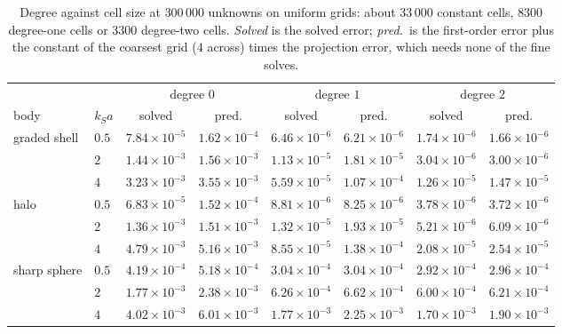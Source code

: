 \documentclass[11pt,a4paper]{article}
\begin{document}
\begin{table}[htbp]
\centering
\caption{Degree against cell size at $300\,000$ unknowns on uniform grids: about $33\,000$ constant cells,
$8300$ degree-one cells or $3300$ degree-two cells. \emph{Solved} is the solved error; \emph{pred.}\ is
the first-order error plus the constant of the coarsest grid ($4$ across) times the projection error,
which needs none of the fine solves.}\label{tab:degreebudget}
\small
\begin{tabular}{@{}llcccccc@{}}
\toprule
 & & \multicolumn{2}{c}{degree $0$} & \multicolumn{2}{c}{degree $1$} & \multicolumn{2}{c}{degree $2$} \\
body & $k_Sa$ & solved & pred. & solved & pred. & solved & pred. \\
\midrule
graded shell & $0.5$ & $7.84\times10^{-5}$ & $1.62\times10^{-4}$ & $6.46\times10^{-6}$ & $6.21\times10^{-6}$ & $1.74\times10^{-6}$ & $1.66\times10^{-6}$ \\
 & $2$ & $1.44\times10^{-3}$ & $1.56\times10^{-3}$ & $1.13\times10^{-5}$ & $1.81\times10^{-5}$ & $3.04\times10^{-6}$ & $3.00\times10^{-6}$ \\
 & $4$ & $3.23\times10^{-3}$ & $3.55\times10^{-3}$ & $5.59\times10^{-5}$ & $1.07\times10^{-4}$ & $1.26\times10^{-5}$ & $1.47\times10^{-5}$ \\
\midrule
halo & $0.5$ & $6.83\times10^{-5}$ & $1.52\times10^{-4}$ & $8.81\times10^{-6}$ & $8.25\times10^{-6}$ & $3.78\times10^{-6}$ & $3.72\times10^{-6}$ \\
 & $2$ & $1.36\times10^{-3}$ & $1.51\times10^{-3}$ & $1.32\times10^{-5}$ & $1.93\times10^{-5}$ & $5.21\times10^{-6}$ & $6.09\times10^{-6}$ \\
 & $4$ & $4.79\times10^{-3}$ & $5.16\times10^{-3}$ & $8.55\times10^{-5}$ & $1.38\times10^{-4}$ & $2.08\times10^{-5}$ & $2.54\times10^{-5}$ \\
\midrule
sharp sphere & $0.5$ & $4.19\times10^{-4}$ & $5.18\times10^{-4}$ & $3.04\times10^{-4}$ & $3.04\times10^{-4}$ & $2.92\times10^{-4}$ & $2.96\times10^{-4}$ \\
 & $2$ & $1.77\times10^{-3}$ & $2.38\times10^{-3}$ & $6.26\times10^{-4}$ & $6.62\times10^{-4}$ & $6.00\times10^{-4}$ & $6.21\times10^{-4}$ \\
 & $4$ & $4.02\times10^{-3}$ & $6.01\times10^{-3}$ & $1.77\times10^{-3}$ & $2.25\times10^{-3}$ & $1.70\times10^{-3}$ & $1.90\times10^{-3}$ \\
\bottomrule
\end{tabular}
\end{table}
\end{document}
